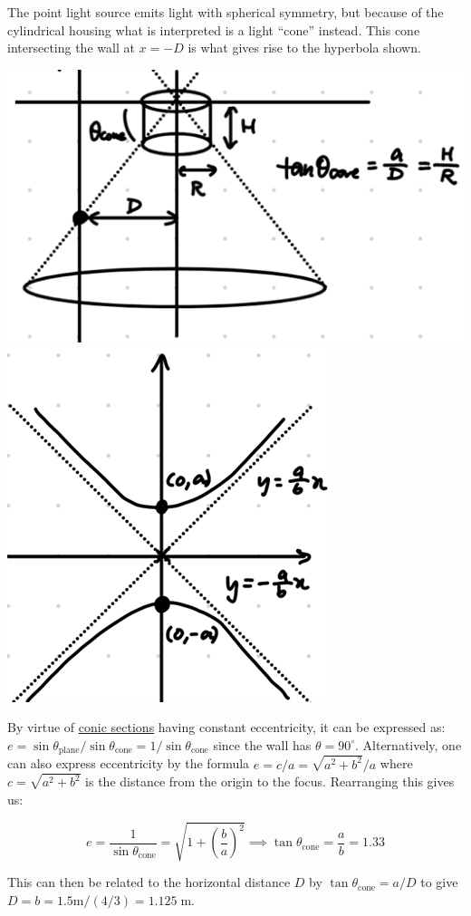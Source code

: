 \begin{solution}
The point light source emits light with spherical symmetry, but because of the cylindrical housing what is interpreted is a light ``cone'' instead. This cone intersecting the wall at $x=-D$ is what gives rise to the hyperbola shown.

\begin{center}
    \includegraphics[height=0.35\textwidth]{solutions/figures/lightConeAnswerDiagram.png}
    \hfill
    \includegraphics[height=0.35\textwidth]{solutions/figures/lightConeAnswerGraph.png}
\end{center}

By virtue of \href{https://www.youtube.com/watch?v=kfWDkVct5mM}{conic sections} having constant eccentricity, it can be expressed as: $e = \sin\theta_\text{plane}/\sin\theta_\text{cone} = 1/\sin\theta_\text{cone}$ since the wall has $\theta = 90^\circ$. Alternatively, one can also express eccentricity by the formula $e=c/a=\sqrt{a^2+b^2}/a$ where $c=\sqrt{a^2+b^2}$ is the distance from the origin to the focus. Rearranging this gives us:

$$e = \frac{1}{\sin\theta_\text{cone}} = \sqrt{1+\left(\frac{b}{a}\right)^2} \implies \tan\theta_\text{cone} = \frac{a}{b} = 1.33$$

This can then be related to the horizontal distance $D$ by $\tan\theta_\text{cone} = a/D$ to give $D = b = 1.5\text{m}/(4/3) = \boxed{1.125\;\text{m}}$.
\end{solution}